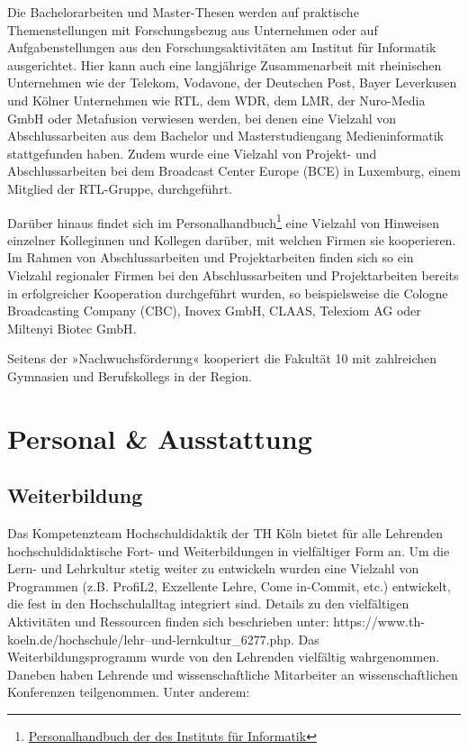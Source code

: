 Die Bachelorarbeiten und Master-Thesen werden auf praktische
Themenstellungen mit Forschungsbezug aus Unternehmen oder auf
Aufgabenstellungen aus den Forschungsaktivitäten am Institut für
Informatik ausgerichtet. Hier kann auch eine langjährige Zusammenarbeit
mit rheinischen Unternehmen wie der Telekom, Vodavone, der Deutschen
Post, Bayer Leverkusen und Kölner Unternehmen wie RTL, dem WDR, dem LMR,
der Nuro-Media GmbH oder Metafusion verwiesen werden, bei denen eine
Vielzahl von Abschlussarbeiten aus dem Bachelor und Masterstudiengang
Medieninformatik stattgefunden haben. Zudem wurde eine Vielzahl von
Projekt- und Abschlussarbeiten bei dem Broadcast Center Europe (BCE) in
Luxemburg, einem Mitglied der RTL-Gruppe, durchgeführt.

Darüber hinaus findet sich im Personalhandbuch\footnote{\href{http://bit.ly/2mpcbWN}{Personalhandbuch
  der des Instituts für Informatik}} eine Vielzahl von Hinweisen
einzelner Kolleginnen und Kollegen darüber, mit welchen Firmen sie
kooperieren. Im Rahmen von Abschlussarbeiten und Projektarbeiten finden
sich so ein Vielzahl regionaler Firmen bei den Abschlussarbeiten und
Projektarbeiten bereits in erfolgreicher Kooperation durchgeführt
wurden, so beispielsweise die Cologne Broadcasting Company (CBC), Inovex
GmbH, CLAAS, Telexiom AG oder Miltenyi Biotec GmbH.

Seitens der »Nachwuchsförderung« kooperiert die Fakultät 10 mit
zahlreichen Gymnasien und Berufskollegs in der Region.

\chapter{Personal \& Ausstattung}\label{personal-ausstattung}

\section{Weiterbildung}\label{weiterbildung}

Das Kompetenzteam Hochschuldidaktik der TH Köln bietet für alle
Lehrenden hochschuldidaktische Fort- und Weiterbildungen in vielfältiger
Form an. Um die Lern- und Lehrkultur stetig weiter zu entwickeln wurden
eine Vielzahl von Programmen (z.B. ProfiL2, Exzellente Lehre, Come
in-Commit, etc.) entwickelt, die fest in den Hochschulalltag integriert
sind. Details zu den vielfältigen Aktivitäten und Ressourcen finden sich
beschrieben unter:
https://www.th-koeln.de/hochschule/lehr--und-lernkultur\_6277.php. Das
Weiterbildungsprogramm wurde von den Lehrenden vielfältig wahrgenommen.
Daneben haben Lehrende und wissenschaftliche Mitarbeiter an
wissenschaftlichen Konferenzen teilgenommen. Unter anderem:

